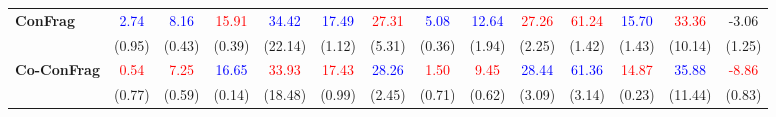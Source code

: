 \documentclass{article}
\theoremstyle{plain}
\theoremstyle{definition}
\theoremstyle{remark}
\begin{document}
\begin{table}[t]
\begin{center}
\begin{small}
{\begin{tabular}{lccccccccccccc}
        \multirow{2}{*}{\textbf{ConFrag}}  & \textcolor{blue}{2.74} & \textcolor{blue}{8.16} & \textcolor{red}{15.91} & \textcolor{blue}{34.42} & \textcolor{blue}{17.49} & \textcolor{red}{27.31} & \textcolor{blue}{5.08} & \textcolor{blue}{12.64} & \textcolor{red}{27.26} & \textcolor{red}{61.24} & \textcolor{blue}{15.70} & \textcolor{red}{33.36} & -3.06 \\
            & (0.95) & (0.43) & (0.39) & (22.14) & (1.12) & (5.31) & (0.36) & (1.94) & (2.25) & (1.42) & (1.43) & (10.14) & (1.25)\\
        \multirow{2}{*}{\textbf{Co-ConFrag}} & \textcolor{red}{0.54} & \textcolor{red}{7.25} & \textcolor{blue}{16.65} & \textcolor{red}{33.93} & \textcolor{red}{17.43} & \textcolor{blue}{28.26} & \textcolor{red}{1.50} & \textcolor{red}{9.45} & \textcolor{blue}{28.44} & \textcolor{blue}{61.36} & \textcolor{red}{14.87} & \textcolor{blue}{35.88} & \textcolor{red}{-8.86} \\
            & (0.77) & (0.59) & (0.14) & (18.48) & (0.99) & (2.45) & (0.71) & (0.62) & (3.09) & (3.14) & (0.23) & (11.44) & (0.83)\\
        \bottomrule
    \end{tabular}
    }
    \end{small}
    \end{center}
    \label{tab:mrae_with_std}
    \vskip -0.2in
\end{table}
\end{document}
